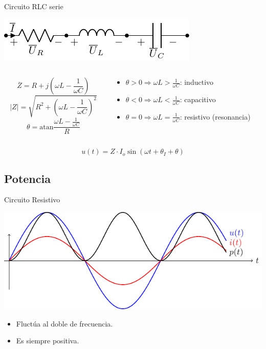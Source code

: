 \documentclass[xcolor={usenames,svgnames,dvipsnames}]{beamer}
\newcommand{\atan}{\mathrm{atan}}
\begin{document}
\begin{frame}[label={sec:org7e38840}]{Circuito RLC serie}
\begin{center}
\includegraphics[height=0.2\textheight]{figs/RLC.pdf}
\end{center}

\begin{columns}
\begin{column}{0.4\columnwidth}
\[
\overline{Z} = R + j(\omega L - \frac{1}{\omega C})
\]
\[
  |Z| = \sqrt{R^2 + (\omega L - \frac{1}{\omega C})^2}
\]
\[
  \theta = \atan{\frac{\omega L - \frac{1}{\omega C}}{R}}
\]
\end{column}

\begin{column}{0.6\columnwidth}
\begin{itemize}
\item \(\theta > 0 \Rightarrow \omega L > \frac{1}{\omega C}\): inductivo
\item \(\theta < 0 \Rightarrow \omega L < \frac{1}{\omega C}\): capacitivo
\item \(\theta = 0 \Rightarrow \omega L = \frac{1}{\omega C}\): resistivo (resonancia)
\end{itemize}
\end{column}
\end{columns}

\[
\boxed{u(t) = Z \cdot I_o \sin(\omega t + \theta_I + \theta)}
\]
\end{frame}

\subsection{Potencia}
\label{sec:orge01e2dc}
\begin{frame}[label={sec:org4667887}]{Circuito Resistivo}
\begin{center}
\includegraphics[width=.9\linewidth]{figs/resistivoPotencia.pdf}
\end{center}

\begin{itemize}
\item Fluctúa al doble de frecuencia.
\item Es siempre positiva.
\end{itemize}
\end{frame}
\end{document}
